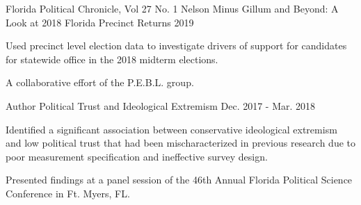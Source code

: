 \begin{cventries}
    \cventry
      {Florida Political Chronicle, Vol 27 No. 1} %
      {Nelson Minus Gillum and Beyond: A Look at 2018 Florida Precinct Returns} %
      {2019} %
      {} %
      {
        \begin{cvitems} %
          \item {Used precinct level election data to investigate drivers of support for candidates for statewide office in the 2018 midterm elections.}
          \item {A collaborative effort of the P.E.B.L. group.}
        \end{cvitems}
      }

    \cventry
      {Author} %
      {Political Trust and Ideological Extremism} %
      {Dec. 2017 - Mar. 2018} %
      {} %
      {
        \begin{cvitems} %
          \item {Identified a significant association between conservative ideological extremism and low political trust that had been mischaracterized in previous research due to poor measurement specification and ineffective survey design.}
          \item {Presented findings at a panel session of the 46th Annual Florida Political Science Conference in Ft. Myers, FL.}
        \end{cvitems}
      }

\end{cventries}
